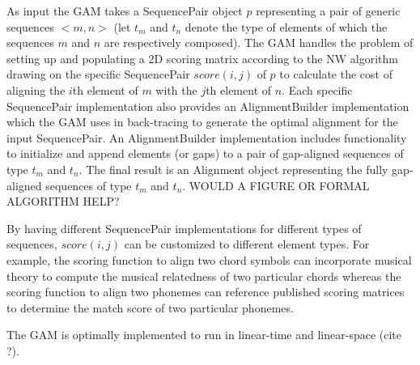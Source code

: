 \documentclass[letterpaper]{article}
\begin{document}
As input the GAM takes a SequencePair object $p$ representing a pair of generic sequences $<m,n>$ (let $t_m$ and $t_n$ denote the type of elements of which the sequences $m$ and $n$ are respectively composed). The GAM handles the problem of setting up and populating a 2D scoring matrix according to the NW algorithm drawing on the specific SequencePair $score(i,j)$ of $p$ to calculate the cost of aligning the $i$th element of $m$ with the $j$th element of $n$. Each specific SequencePair implementation also provides an AlignmentBuilder implementation which the GAM uses in back-tracing to generate the optimal alignment for the input SequencePair. An AlignmentBuilder implementation includes functionality to initialize and append elements (or gaps) to a pair of gap-aligned sequences of type $t_m$ and $t_n$.  The final result is an Alignment object representing the fully gap-aligned sequences of type $t_m$ and $t_n$. WOULD A FIGURE OR FORMAL ALGORITHM HELP?

By having different SequencePair implementations for different types of sequences, $score(i,j)$ can be customized to different element types. For example, the scoring function to align two chord symbols can incorporate musical theory to compute the musical relatedness of two particular chords whereas the scoring function to align two phonemes can reference published scoring matrices to determine the match score of two particular phonemes.

The GAM is optimally implemented to run in linear-time and linear-space (cite ?).

\newcommand{\gbfs}{\ensuremath{\mbox{\sc MAX-DIR Greedy Heuristic}}}
\renewcommand{\algorithmicrequire}{\textbf{Input:}}
\begin{algorithm}[b]
\caption{$\gbfs$}\label{alg:bidirected_subgraph} 
\begin{algorithmic}[1]
{}
\ENDFOR
\ENDIF
{}
\ELSE
{}
\ENDIF
\ENDWHILE
{}
\end{algorithmic}
\end{algorithm}\
\end{document}
